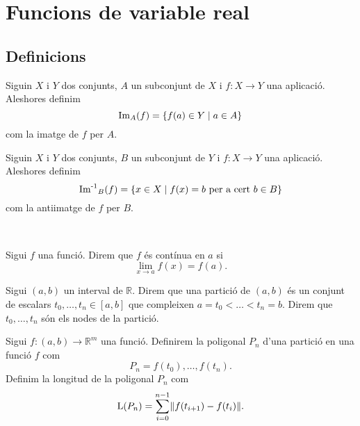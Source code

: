 \documentclass[../../Main.tex]{subfiles}
\begin{document}
\section{Funcions de variable real}
	\subsection{Definicions}
	\begin{definition}[Imatge]
		\label{def:imatge d'una aplicació}
		Siguin \(X\) i \(Y\) dos conjunts, \(A\) un subconjunt de \(X\) i \(f\colon X\longrightarrow Y\) una aplicació. Aleshores definim
		\[\operatorname{Im}_{A}(f)=\{f(a)\in Y\mid a\in A\}\]
		com la imatge de \(f\) per \(A\).
	\end{definition}
	\begin{definition}[Antiimatge]
		\label{def:antiimatge d'una aplicació}
		Siguin \(X\) i \(Y\) dos conjunts, \(B\) un subconjunt de \(Y\) i \(f\colon X\longrightarrow Y\) una aplicació. Aleshores definim
		\[\operatorname{\operatorname{Im}^{-1}}_{B}(f)=\{x\in X\mid f(x)=b\text{ per a cert }b\in B\}\]
		com la antiimatge de \(f\) per \(B\).
	\end{definition}
	\begin{definition}[Límit]
		\label{def:límit}\
	\end{definition}
	\begin{definition}
		\label{def:funcio continua}\label{def:funció contínua}
		Sigui \(f\) una funció. Direm que \(f\) és contínua en \(a\) si
		\[\lim_{x\to a}f(x)=f(a).\]
	\end{definition}
	\begin{definition}
		\label{def:partició}
		\label{def:poligonal}
		\label{def:longitud de poligonal}
		Sigui \((a,b)\) un interval de \(\mathbb{R}\). Direm que una partició de \((a,b)\) és un conjunt de escalars \(t_{0},\dots,t_{n}\in[a,b]\) que compleixen \(a=t_{0}<\dots<t_{n}=b\). Direm que \(t_{0},\dots,t_{n}\) són els nodes de la partició.
		
		Sigui \(f\colon(a,b)\to\mathbb{R}^{m}\) una funció. Definirem la poligonal \(P_{n}\) d'una partició en una funció \(f\) com
		\[P_{n}=f(t_{0}),\dots,f(t_{n}).\]
		Definim la longitud de la poligonal \(P_{n}\) com
		\[\Long(P_{n})=\sum_{i=0}^{n-1}\left\lVert f(t_{i+1})-f(t_{i})\right\rVert.\]
	\end{definition}
\end{document}

